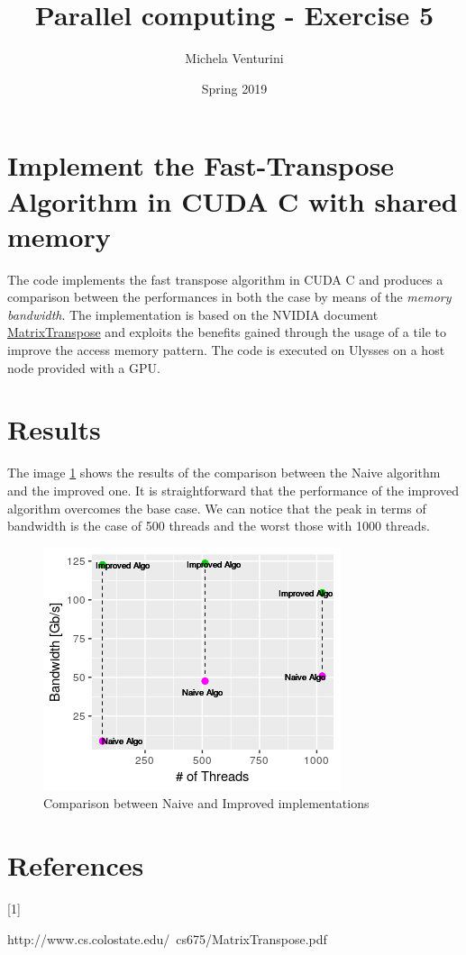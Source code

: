 \documentclass[]{scrartcl}
\title{\textbf{Parallel computing - Exercise 5}}
\author{Michela Venturini}
\date{Spring 2019}
\begin{document}
\maketitle
\section{Implement the Fast-Transpose Algorithm in CUDA C with shared memory}
 The code implements the fast transpose algorithm in CUDA C and produces a comparison between the performances in both the case by means of the \textit{memory bandwidth}. The implementation is based on the NVIDIA document \hyperlink{mt}{MatrixTranspose} and exploits the benefits gained through the usage of a tile to improve the access memory pattern.
The code is executed on Ulysses on a host node provided with a GPU.
\section{Results}
The image \ref{fig_1} shows the results of the comparison between the Naive algorithm and the improved one. It is straightforward that the performance of the improved algorithm overcomes the base case. We can notice that the peak in terms of bandwidth is the case of 500 threads and the worst those with 1000 threads. 
 \begin{figure}[]
	\begin{centering}
		\includegraphics[scale=1]{plot6}
		\caption{Comparison between Naive and Improved implementations}
		\label{fig_1}
	\end{centering}
\end{figure}


\section{References}
\hypertarget{mt}{[1] }http://www.cs.colostate.edu/~cs675/MatrixTranspose.pdf
\end{document}
